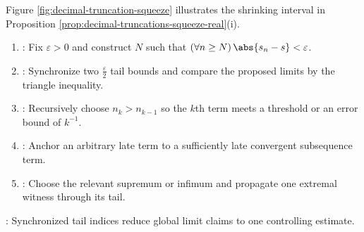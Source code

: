\begin{illustrationfigure}[H]
  \centering
  
  \caption{At precision $10^{-n}$, $x$ lies in the half-open cell $[s_n10^{-n},(s_n+1)10^{-n})$ of width $10^{-n}$.}
  \label{fig:decimal-truncation-squeeze}
\end{illustrationfigure}
Figure \ref{fig:decimal-truncation-squeeze} illustrates the shrinking interval in Proposition \ref{prop:decimal-truncations-squeeze-real}(i).

\begin{proofmethod} \label{meth:sequence-proof-patterns} 
\begin{enumerate}[label=(\roman*)]
\setlength{\itemsep}{0pt}
\item {}: Fix $\varepsilon>0$ and construct $N$ such that $(\forall n\geq N)\,\abs{s_n-s}<\varepsilon$.
\item {}: Synchronize two $\frac{\varepsilon}{2}$ tail bounds and compare the proposed limits by the triangle inequality.
\item {}: Recursively choose $n_k>n_{k-1}$ so the $k$th term meets a threshold or an error bound of $k^{-1}$.
\item {}: Anchor an arbitrary late term to a sufficiently late convergent subsequence term.
\item {}: Choose the relevant supremum or infimum and propagate one extremal witness through its tail.
\end{enumerate}
: Synchronized tail indices reduce global limit claims to one controlling estimate.
\end{proofmethod}
